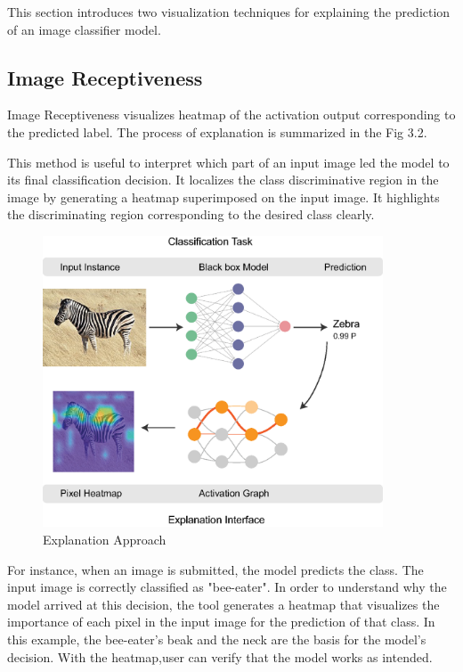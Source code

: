 This section introduces two visualization techniques for explaining the prediction of an image classifier model.

\subsection{Image Receptiveness}

Image Receptiveness visualizes heatmap of the activation output corresponding to the predicted label. The process of explanation is summarized in the Fig 3.2.

This method is useful to interpret which part of an input image led the model to its final classification decision. It localizes the class discriminative region in the image by generating a heatmap superimposed on the input image. It highlights the discriminating region corresponding to the desired class clearly.

\begin{figure}[htbp]
\centering
\includegraphics[width=0.9\textwidth]{images/method-schema-copy.eps}
\caption{Explanation Approach}
\label{fig:explanation-approach}
\end{figure}

For instance, when an image is submitted, the model predicts the class. The input image is correctly classified as "bee-eater". In order to understand why the model arrived at this decision, the tool generates a heatmap that visualizes the importance of each pixel in the input image for the prediction of that class. In this example, the bee-eater's beak and the neck are the basis for the model's decision. With the heatmap,user can verify that the model works as intended.

